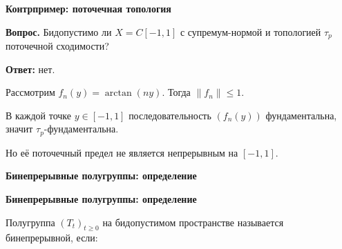 \documentclass[11pt]{article}
\begin{document}
\begin{center}
{\color{notaeYELLOW}\bfseries\fontsize{44}{52}\selectfont Контрпример: поточечная топология}
\end{center}
\vspace*{\fill}
\begin{center}
\fontsize{36}{43}\selectfont
\parbox{\linewidth}{\centering\noindent \textbf{Вопрос.} Бидопустимо ли $X=C[-1,1]$ с супремум-нормой и топологией $\tau_p$ поточечной сходимости?
\par}\vspace{0.4in}
\parbox{\linewidth}{\centering\noindent \textbf{Ответ:} нет.
\par}\vspace{0.4in}
\parbox{\linewidth}{\centering\noindent Рассмотрим $f_n(y)=\arctan(ny)$. Тогда $\|f_n\|\le 1$.
\par}\vspace{0.4in}
\parbox{\linewidth}{\centering\noindent В каждой точке $y\in[-1,1]$ последовательность $(f_n(y))$ фундаментальна, значит $\tau_p$-фундаментальна.
\par}\vspace{0.4in}
\parbox{\linewidth}{\centering\noindent Но её поточечный предел не является непрерывным на $[-1,1]$.
\par}\vspace{0.4in}
\end{center}
\vspace*{\fill}

\newpage

\begin{center}
{\color{notaeYELLOW}\bfseries\fontsize{44}{52}\selectfont Бинепрерывные полугруппы: определение}
\end{center}
\vspace*{\fill}
\begin{center}
\fontsize{36}{43}\selectfont
\end{center}
\vspace*{\fill}

\newpage

\begin{center}
{\color{notaeYELLOW}\bfseries\fontsize{44}{52}\selectfont Бинепрерывные полугруппы: определение}
\end{center}
\vspace*{\fill}
\begin{center}
\fontsize{36}{43}\selectfont
\parbox{\linewidth}{\centering\noindent Полугруппа $(T_t)_{t\ge0}$ на бидопустимом пространстве называется бинепрерывной, если:
\par}\vspace{0.4in}
\end{center}
\vspace*{\fill}
\end{document}
